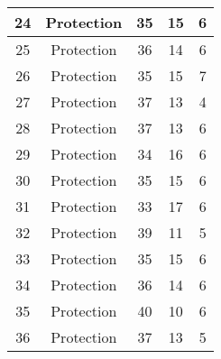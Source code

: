 \documentclass[results.tex]{subfiles}
\begin{document}
\begin{center}
\begin{tabular}{| c || c | c | c | c |}
            \hline
            24                      & Protection                   & 35                     & 15                      & 6                    \\
            \hline
            25                      & Protection                   & 36                     & 14                      & 6                    \\
            \hline
            26                      & Protection                   & 35                     & 15                      & 7                    \\
            \hline
            27                      & Protection                   & 37                     & 13                      & 4                    \\
            \hline
            28                      & Protection                   & 37                     & 13                      & 6                    \\
            \hline
            29                      & Protection                   & 34                     & 16                      & 6                    \\
            \hline
            30                      & Protection                   & 35                     & 15                      & 6                    \\
            \hline
            31                      & Protection                   & 33                     & 17                      & 6                    \\
            \hline
            32                      & Protection                   & 39                     & 11                      & 5                    \\
            \hline
            33                      & Protection                   & 35                     & 15                      & 6                    \\
            \hline
            34                      & Protection                   & 36                     & 14                      & 6                    \\
            \hline
            35                      & Protection                   & 40                     & 10                      & 6                    \\
            \hline
            36                      & Protection                   & 37                     & 13                      & 5                    \\

\end{tabular}
\end{center}
\end{document}
